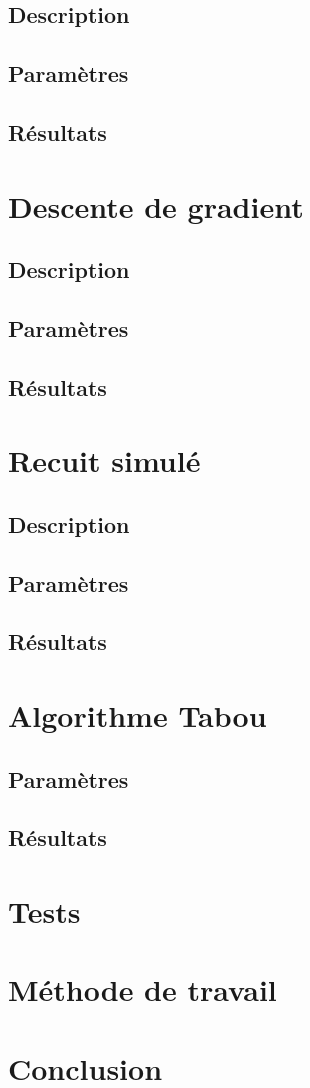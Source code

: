 \documentclass[12pt]{article}
\begin{document}
\subsection{Description}
\subsection{Paramètres}
\subsection{Résultats}

\section{Descente de gradient}
\subsection{Description}
\subsection{Paramètres}
\subsection{Résultats}

\section{Recuit simulé}
\subsection{Description}
\subsection{Paramètres}
\subsection{Résultats}

\section{Algorithme Tabou}
\subsection{Paramètres}
\subsection{Résultats}

\section{Tests}

\section{Méthode de travail}

\section{Conclusion}
		
\end{document}
